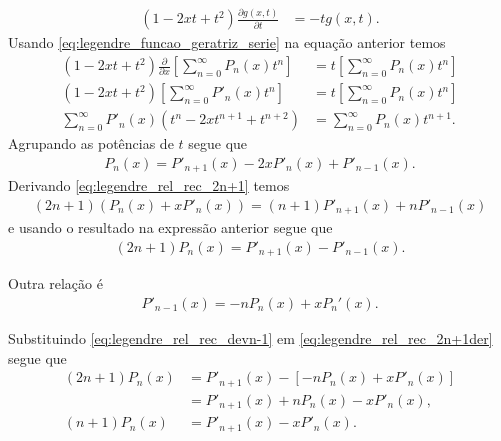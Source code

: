 \documentclass[a4paper,12pt, leqno, answers]{exam}
\begin{document}
\begin{questions}
\begin{solution}
\begin{align*}
            \left( 1 - 2 x t + t^2 \right) \frac{\partial g(x, t)}{\partial t} &= -t g(x, t).
        \end{align*}
        Usando \eqref{eq:legendre_funcao_geratriz_serie} na equa\c{c}\~{a}o anterior temos
        \begin{align*}
            \left( 1 - 2 x t + t^2 \right) \frac{\partial}{\partial x}\left[ \sum_{n = 0}^\infty P_n(x) t^n \right] &= t \left[ \sum_{n = 0}^\infty P_n(x) t^n \right] \\
            \left( 1 - 2 x t + t^2 \right) \left[ \sum_{n = 0}^\infty P'_n(x) t^{n} \right] &= t \left[ \sum_{n = 0}^\infty P_n(x) t^n \right] \\
            \sum_{n = 0}^\infty P'_n(x) \left( t^{n} - 2 x t^{n + 1} + t^{n + 2} \right) &= \sum_{n = 0}^\infty P_n(x) t^{n + 1}.
        \end{align*}
        Agrupando as pot\^{e}ncias de $t$ segue que
        \begin{align*}
            P_n(x) = P'_{n + 1}(x) - 2 x P'_n(x) + P'_{n - 1}(x). %
        \end{align*}
        Derivando \eqref{eq:legendre_rel_rec_2n+1} temos
        \begin{align*}
            (2n + 1) (P_n(x) + x P'_n(x)) = (n + 1) P'_{n + 1}(x) + n P'_{n - 1}(x)
        \end{align*}
        e usando o resultado na express\~{a}o anterior segue que
        \begin{align}
            (2n + 1)P_n(x) = P'_{n + 1}(x) - P'_{n - 1}(x). \label{eq:legendre_rel_rec_2n+1der}
        \end{align}

        Outra rela\c{c}\~{a}o \'{e}
        \begin{align}
            P'_{n - 1}(x) = -n P_n(x) + x P_n'(x). \label{eq:legendre_rel_rec_devn-1}
        \end{align}

        Substituindo \eqref{eq:legendre_rel_rec_devn-1} em \eqref{eq:legendre_rel_rec_2n+1der} segue que
        \begin{align*}
            (2n + 1) P_n(x) &= P'_{n + 1}(x) - \left[ -n P_n(x) + x P'_n(x) \right] \\
            &= P'_{n + 1}(x) + n P_n(x) - x P'_n(x), \\
            (n + 1) P_n(x) &= P'_{n + 1}(x) - x P'_n(x).
        \end{align*}


\end{solution}
\end{questions}
\end{document}
